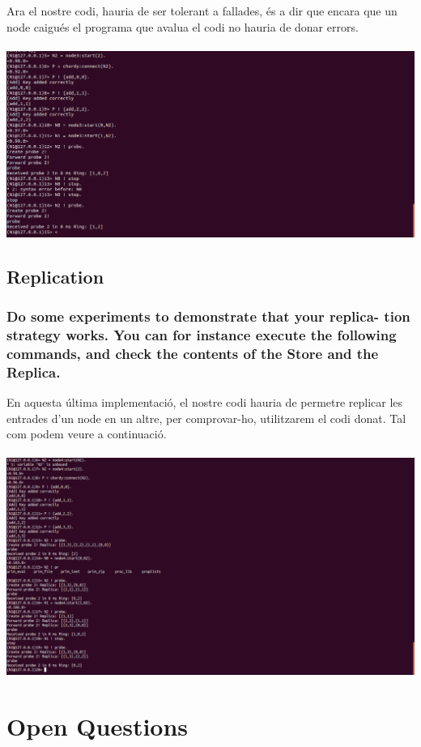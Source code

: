 \documentclass[a4paper, 10pt]{article}
\begin{document}
Ara el nostre codi, hauria de ser tolerant a fallades, és a dir que encara que un node caigués el programa que avalua el codi no hauria de donar errors.\\\\
\includegraphics[width=\textwidth]{Ex6.png}

\newpage\subsection{Replication}
\subsubsection{Do some experiments to demonstrate that your replica- tion strategy works. You can for instance execute the following commands, and check the contents of the Store and the Replica.}

En aquesta última implementació, el nostre codi hauria de permetre replicar les entrades d'un node en un altre, per comprovar-ho, utilitzarem el codi donat. Tal com podem veure a continuació.\\\\

\includegraphics[width=\textwidth]{Ex7.png}
\newpage\section{Open Questions}
\end{document}
